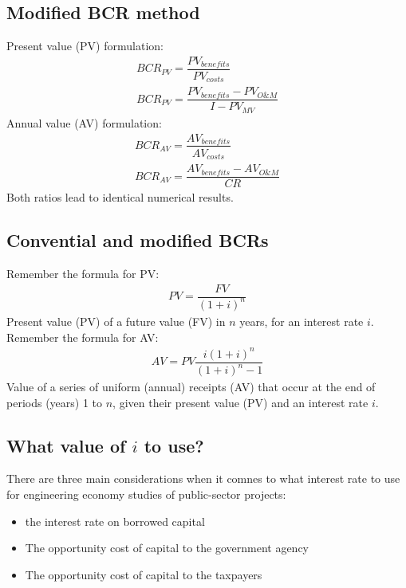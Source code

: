 \documentclass[class=report, crop=false, 12pt,a4paper]{standalone}
\begin{document}
\subsection{Modified BCR method}
Present value (PV) formulation:
\begin{gather}
	BCR_{PV} = \dfrac{PV_{benefits}}{PV_{costs}}\\
	BCR_{PV} = \dfrac{PV_{benefits} - PV_{O\&M}}{I - PV_{MV}}
\end{gather}
Annual value (AV) formulation:
\begin{gather}
	BCR_{AV} = \dfrac{AV_{benefits}}{AV_{costs}}\\
	BCR_{AV} = \dfrac{AV_{benefits}-AV_{O\&M}}{CR}
\end{gather}
Both ratios lead to identical numerical results.
\subsection{Convential and modified BCRs}
Remember the formula for PV:
\begin{gather}
	PV = \dfrac{FV}{(1+i)^n}
\end{gather}
Present value (PV) of a future value (FV) in $n$ years, for an interest rate $i$. 
Remember the formula for AV:
\begin{gather}
	AV = PV\dfrac{i(1+i)^n}{(1+i)^n - 1}
\end{gather}
Value of a series of uniform (annual) receipts (AV) that occur at the end of periods (years) 1 to $n$, given their present value (PV) and an interest rate $i$.
\subsection{What value of $i$ to use?}
There are three main considerations when it comnes to what interest rate to use for engineering economy studies of public-sector projects:
\begin{itemize}
	\item the interest rate on borrowed capital
	\item The opportunity cost of capital to the government agency
	\item The opportunity cost of capital to the taxpayers
\end{itemize}
\end{document}
